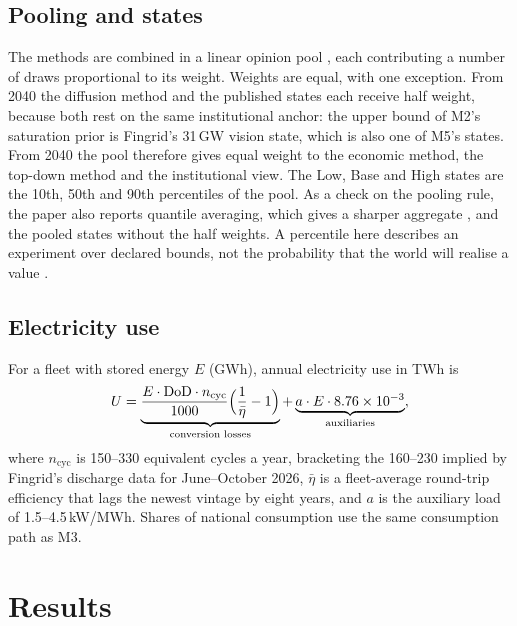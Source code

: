 \documentclass[11pt]{article}
\begin{document}
\subsection{Pooling and states}
The methods are combined in a linear opinion pool \citep{clemen1999combining}, each contributing a number of draws proportional to its weight.
Weights are equal, with one exception. From 2040 the diffusion method and the published states each receive half weight, because both rest on the same institutional anchor: the upper bound of M2's saturation prior is Fingrid's 31\,GW vision state, which is also one of M5's states. From 2040 the pool therefore gives equal weight to the economic method, the top-down method and the institutional view.
The Low, Base and High states are the 10th, 50th and 90th percentiles of the pool.
As a check on the pooling rule, the paper also reports quantile averaging, which gives a sharper aggregate \citep{lichtendahl2013quantiles}, and the pooled states without the half weights.
A percentile here describes an experiment over declared bounds, not the probability that the world will realise a value \citep{morgan1990uncertainty}.

\subsection{Electricity use}\label{sec:usemethod}
For a fleet with stored energy $E$ (GWh), annual electricity use in TWh is
\begin{equation}\label{eq:use}
U = \underbrace{\frac{E\cdot \mathrm{DoD}\cdot n_{\mathrm{cyc}}}{1000}\Bigl(\frac{1}{\bar\eta}-1\Bigr)}_{\text{conversion losses}}
+ \underbrace{a\cdot E\cdot 8.76\times10^{-3}}_{\text{auxiliaries}},
\end{equation}
where $n_{\mathrm{cyc}}$ is 150--330 equivalent cycles a year, bracketing the 160--230 implied by Fingrid's discharge data for June--October 2026, $\bar\eta$ is a fleet-average round-trip efficiency that lags the newest vintage by eight years, and $a$ is the auxiliary load of 1.5--4.5\,kW/MWh.
Shares of national consumption use the same consumption path as M3.

\section{Results}\label{sec:results}
\end{document}
